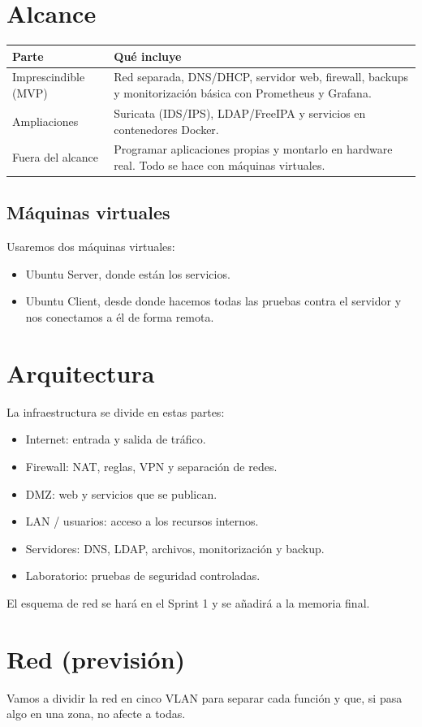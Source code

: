 \documentclass[12pt,a4paper]{article}
\begin{document}
\section{Alcance}
\begin{longtable}{|p{}|p{}|}
\hline
\textbf{Parte} & \textbf{Qué incluye}\\ \hline
Imprescindible (MVP) & Red separada, DNS/DHCP, servidor web, firewall, backups y monitorización básica con Prometheus y Grafana.\\ \hline
Ampliaciones & Suricata (IDS/IPS), LDAP/FreeIPA y servicios en contenedores Docker.\\ \hline
Fuera del alcance & Programar aplicaciones propias y montarlo en hardware real. Todo se hace con máquinas virtuales.\\ \hline
\end{longtable}

\subsection{Máquinas virtuales}
Usaremos dos máquinas virtuales:
\begin{itemize}
\item Ubuntu Server, donde están los servicios.
\item Ubuntu Client, desde donde hacemos todas las pruebas contra el servidor y nos conectamos a él de forma remota.
\end{itemize}

\section{Arquitectura}
La infraestructura se divide en estas partes:
\begin{itemize}
\item Internet: entrada y salida de tráfico.
\item Firewall: NAT, reglas, VPN y separación de redes.
\item DMZ: web y servicios que se publican.
\item LAN / usuarios: acceso a los recursos internos.
\item Servidores: DNS, LDAP, archivos, monitorización y backup.
\item Laboratorio: pruebas de seguridad controladas.
\end{itemize}
El esquema de red se hará en el Sprint 1 y se añadirá a la memoria final.

\section{Red (previsión)}
Vamos a dividir la red en cinco VLAN para separar cada función y que, si pasa algo en una zona, no afecte a todas.
\end{document}

